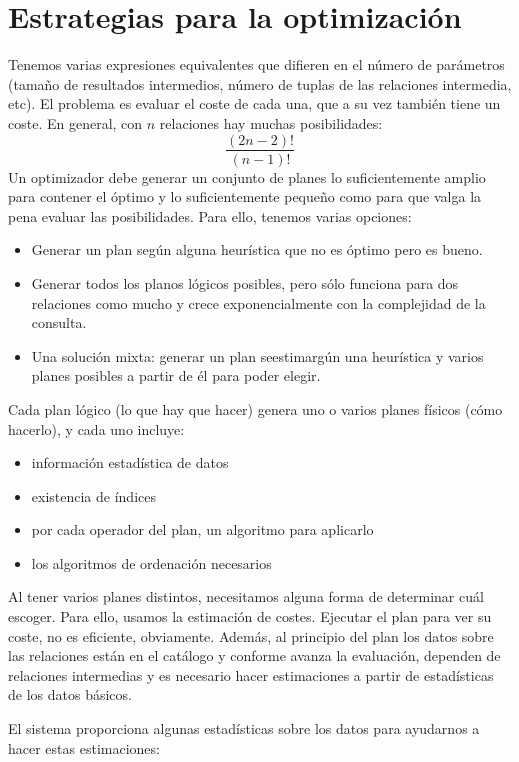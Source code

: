 \section{Estrategias para la optimización}
Tenemos varias expresiones equivalentes que difieren en el número de parámetros (tamaño de resultados intermedios, número de tuplas de las relaciones intermedia, etc). El problema es evaluar el coste de cada una, que a su vez también tiene un coste. En general, con $n$ relaciones hay muchas posibilidades:
\[
\frac{(2n-2)!}{(n-1)!}
\]
Un optimizador debe generar un conjunto de planes lo suficientemente amplio para contener el óptimo y lo suficientemente pequeño como para que valga la pena evaluar las posibilidades. Para ello, tenemos varias opciones:
\begin{itemize}
\item Generar un plan según alguna heurística que no es óptimo pero es bueno.
\item Generar todos los planos lógicos posibles, pero sólo funciona para dos relaciones como mucho y crece exponencialmente con la complejidad de la consulta.
\item Una solución mixta: generar un plan seestimargún una heurística y varios planes posibles a partir de él para poder elegir.
\end{itemize}
Cada plan lógico (lo que hay que hacer) genera uno o varios planes físicos (cómo hacerlo), y cada uno incluye:
\begin{itemize}
\item información estadística de datos
\item existencia de índices
\item por cada operador del plan, un algoritmo para aplicarlo
\item los algoritmos de ordenación necesarios
\end{itemize}
Al tener varios planes distintos, necesitamos alguna forma de determinar cuál escoger. Para ello, usamos la estimación de costes. Ejecutar el plan para ver su coste, no es eficiente, obviamente. Además, al principio del plan los datos sobre las relaciones están en el catálogo y conforme avanza la evaluación, dependen de relaciones intermedias y es necesario hacer estimaciones a partir de estadísticas de los datos básicos.

El sistema proporciona algunas estadísticas sobre los datos para ayudarnos a hacer estas estimaciones:

